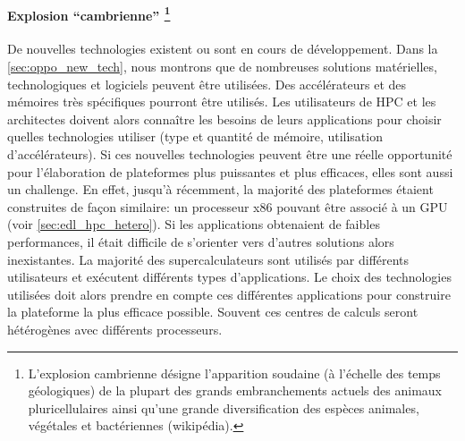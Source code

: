         

        \paragraph[Explosion cambrienne] {Explosion ``cambrienne'' \footnote{L’explosion cambrienne désigne l'apparition soudaine (à l'échelle des temps géologiques) de la plupart des grands embranchements actuels des animaux pluricellulaires ainsi qu'une grande diversification des espèces animales, végétales et bactériennes (wikipédia).}}
        
            De nouvelles technologies existent ou sont en cours de développement. Dans la \autoref{sec:oppo_new_tech}, nous montrons que de nombreuses solutions matérielles, technologiques et logiciels peuvent être utilisées. Des accélérateurs et des mémoires très spécifiques pourront être utilisés. Les utilisateurs de HPC et les architectes doivent alors connaître les besoins de leurs applications pour choisir quelles technologies utiliser (type et quantité de mémoire, utilisation d'accélérateurs). Si ces nouvelles technologies peuvent être une réelle opportunité pour l'élaboration de plateformes plus puissantes et plus efficaces, elles sont aussi un challenge. En effet, jusqu’à récemment, la majorité des plateformes étaient construites de façon similaire: un processeur x86 pouvant être associé à un GPU (voir \autoref{sec:edl_hpc_hetero}). Si les applications obtenaient de faibles performances, il était difficile de s'orienter vers d'autres solutions alors inexistantes. La majorité des supercalculateurs sont utilisés par différents utilisateurs et exécutent différents types d'applications. Le choix des technologies utilisées doit alors prendre en compte ces différentes applications pour construire la plateforme la plus efficace possible. Souvent ces centres de calculs seront hétérogènes avec différents processeurs.
        
